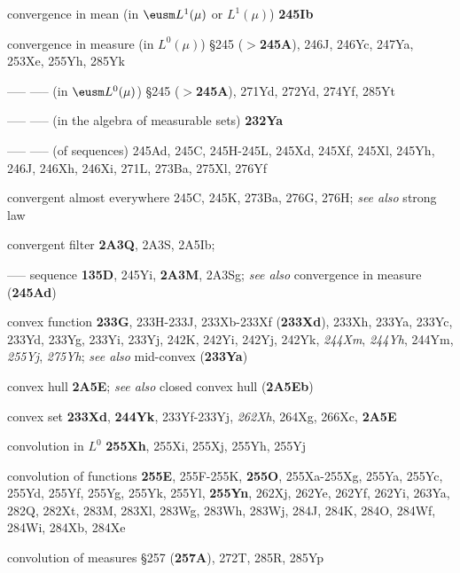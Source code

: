 convergence in mean (in $\eusm L^1(\mu)$ or $L^1(\mu)$) {\bf 245Ib}


convergence in measure (in $L^0(\mu)$) \S245 ($\pmb{>}${\bf 245A}),
246J, 246Yc, 247Ya, 253Xe, 255Yh, 285Yk


----- ----- (in $\eusm L^0(\mu)$) \S245 ($\pmb{>}${\bf 245A}),
271Yd, 272Yd, 274Yf, 285Yt


----- ----- (in the algebra of measurable sets) {\bf 232Ya}




----- ----- (of sequences) 245Ad, 245C,
245H-245L, 
245Xd, 245Xf, 245Xl, 245Yh, 246J, 246Xh, 246Xi,
271L, 273Ba, 275Xl, 276Yf




convergent almost everywhere 245C, 245K, 273Ba, 276G, 276H;
  {\it see also} strong law


convergent filter {\bf 2A3Q}, 2A3S, 2A5Ib;  




{----- }
sequence {\bf 135D}, 245Yi, {\bf 2A3M}, 2A3Sg; 
  {\it see also} convergence in measure ({\bf 245Ad})
  



convex function {\bf 233G}, 233H-233J, 
233Xb-233Xf ({\bf 233Xd}), 
233Xh, 233Ya, 233Yc, 233Yd, 233Yg, 233Yi, 233Yj,
242K, 242Yi, 242Yj, 242Yk, {\it 244Xm}, {\it 244Yh}, 244Ym,
{\it 255Yj}, {\it 275Yh};
  {\it see also} mid-convex ({\bf 233Ya})


convex hull {\bf 2A5E};
  {\it see also} closed convex hull ({\bf 2A5Eb})






convex set {\bf 233Xd}, {\bf 244Yk},
233Yf-233Yj, 
{\it 262Xh}, 264Xg, 266Xc,
{\bf 2A5E}











convolution in $L^0$ {\bf 255Xh}, 255Xi, 255Xj, 255Yh, 255Yj


convolution of functions {\bf 255E},
255F-255K, 
{\bf 255O}, 255Xa-255Xg, 
255Ya, 255Yc, 255Yd,  255Yf, 255Yg, 255Yk, 255Yl, {\bf 255Yn},
262Xj, 262Ye, 262Yf, 262Yi, 263Ya, 282Q, 282Xt, 283M, 283Xl,
283Wg, 283Wh, 283Wj, 284J, 284K, 284O, 284Wf, 284Wi, 284Xb, 284Xe


convolution of measures \S257 ({\bf 257A}), 272T, 285R,
285Yp


